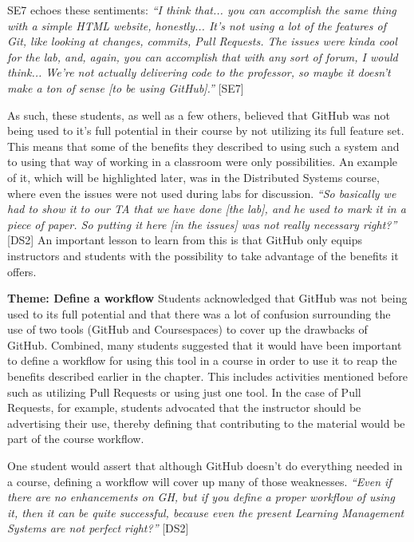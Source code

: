 SE7 echoes these sentiments: \textit{``I think that... you can accomplish the same thing with a simple HTML website, honestly... It's not using a lot of the features of Git, like looking at changes, commits, Pull Requests. The issues were kinda cool for the lab, and, again, you can accomplish that with any sort of forum, I would think... We're not actually delivering code to the professor, so maybe it doesn't make a ton of sense [to be using GitHub].''} [SE7]

As such, these students, as well as a few others, believed that GitHub was not being used to it's full potential in their course by not utilizing its full feature set. This means that some of the benefits they described to using such a system and to using that way of working in a classroom were only possibilities. An example of it, which will be highlighted later, was in the Distributed Systems course, where even the issues were not used during labs for discussion. \textit{``So basically we had to show it to our TA that we have done [the lab], and he used to mark it in a piece of paper. So putting it here [in the issues] was not really necessary right?''} [DS2] An important lesson to learn from this is that GitHub only equips instructors and students with the possibility to take advantage of the benefits it offers. %

\textbf{Theme: Define a workflow} \break
Students acknowledged that GitHub was not being used to its full potential and that there was a lot of confusion surrounding the use of two tools (GitHub and Coursespaces) to cover up the drawbacks of GitHub. Combined, many students suggested that it would have been important to define a workflow for using this tool in a course in order to use it to reap the benefits described earlier in the chapter. This includes activities mentioned before such as utilizing Pull Requests or using just one tool. In the case of Pull Requests, for example, students advocated that the instructor should be advertising their use, thereby defining that contributing to the material would be part of the course workflow.

One student would assert that although GitHub doesn't do everything needed in a course, defining a workflow will cover up many of those weaknesses. \textit{``Even if there are no enhancements on GH, but if you define a proper workflow of using it, then it can be quite successful, because even the present Learning Management Systems are not perfect right?''} [DS2]

